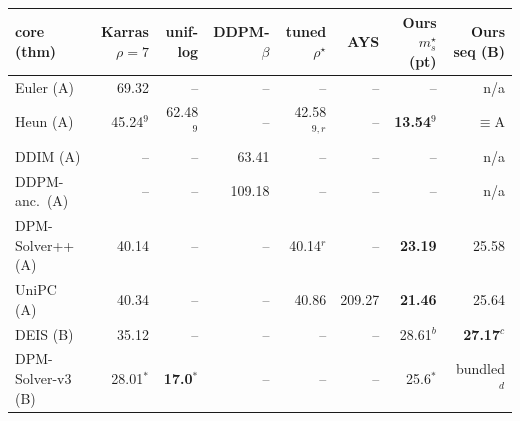 \documentclass[11pt]{article}
\begin{document}
\begin{center}
\scriptsize
\begin{tabular}{l r r r r r r r}
\toprule
core (thm) & Karras \(\rho{=}7\) & unif-log & DDPM-\(\beta\) & tuned \(\rho^\star\) & AYS & Ours \(m_s^\star\) (pt) & Ours seq (B) \\
\midrule
Euler (A)            & 69.32        & --            & --      & --     & --       & --              & n/a \\
Heun (A)             & 45.24\(^9\)  & 62.48\(^9\)   & --      & 42.58\(^{9,r}\) & --       & \textbf{13.54}\(^9\) & \(\equiv\)A \\
DDIM (A)             & --           & --            & 63.41   & --     & --       & --              & n/a \\
DDPM-anc.\ (A)       & --           & --            & 109.18  & --     & --       & --              & n/a \\
DPM-Solver++ (A)     & 40.14        & --            & --      & 40.14\(^{r}\) & --       & \textbf{23.19}  & 25.58 \\
UniPC (A)            & 40.34        & --            & --      & 40.86  & 209.27   & \textbf{21.46}  & 25.64 \\
DEIS (B)             & 35.12        & --            & --      & --     & --       & 28.61\(^b\)     & \textbf{27.17}\(^c\) \\
DPM-Solver-v3 (B)    & 28.01\(^*\)  & \textbf{17.0}\(^*\) & -- & --     & --       & 25.6\(^*\) & bundled\(^d\) \\
\bottomrule
\end{tabular}
\end{center}
\end{document}
